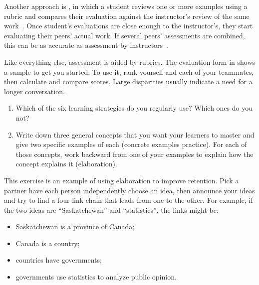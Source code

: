 Another approach is ,
in which a student reviews one or more examples using a rubric
and compares their evaluation against the instructor's review of the same work~\cite{Kulk2013}.
Once student's evaluations are close enough to the instructor's,
they start evaluating their peers' actual work.
If several peers' assessments are combined,
this can be as accurate as assessment by instructors~\cite{Pare2008}.

Like everything else,
assessment is aided by rubrics.
The evaluation form in  shows a sample to get you started.
To use it,
rank yourself and each of your teammates,
then calculate and compare scores.
Large disparities usually indicate a need for a longer conversation.



\begin{enumerate}

\item
  Which of the six learning strategies do you regularly use?
  Which ones do you not?

\item
  Write down three general concepts that you want your learners to   master
  and give two specific examples of each
  (concrete examples practice).
  For each of those concepts,
  work backward from one of your examples to explain how the concept explains it
  (elaboration).

\end{enumerate}


This exercise is an example of using elaboration to improve retention.
Pick a partner
have each person independently choose an idea,
then announce your ideas and try to find a four-link chain
that leads from one to the other.
For example,
if the two ideas are ``Saskatchewan'' and ``statistics'',
the links might be:

\begin{itemize}

\item
  Saskatchewan is a province of Canada;

\item
  Canada is a country;

\item
  countries have governments;

\item
  governments use statistics to analyze public opinion.

\end{itemize}

